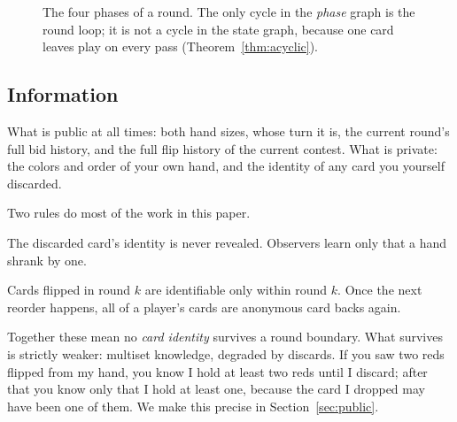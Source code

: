 \documentclass[11pt]{article}
\theoremstyle{plain}
\theoremstyle{definition}
\theoremstyle{remark}
\begin{document}
\begin{figure}[t]
\centering
{}
\caption{The four phases of a round. The only cycle in the \emph{phase}
graph is the round loop; it is not a cycle in the state graph, because one
card leaves play on every pass (Theorem~\ref{thm:acyclic}).}
\label{fig:phases}
\end{figure}

\subsection{Information}\label{sec:info}

What is public at all times: both hand sizes, whose turn it is, the current
round's full bid history, and the full flip history of the current contest.
What is private: the colors and order of your own hand, and the identity
of any card you yourself discarded.

Two rules do most of the work in this paper.

\begin{description}\itemsep3pt
  \item[Discard anonymity.] The discarded card's identity is never
        revealed. Observers learn only that a hand shrank by one.
  \item[Reorder scrambling.] Cards flipped in round $k$ are identifiable
        only within round $k$. Once the next reorder happens, all of a
        player's cards are anonymous card backs again.
\end{description}

Together these mean no \emph{card identity} survives a round boundary. What
survives is strictly weaker: multiset knowledge, degraded by discards. If
you saw two reds flipped from my hand, you know I hold at least two reds
until I discard; after that you know only that I hold at least one, because
the card I dropped may have been one of them. We make this precise in
Section~\ref{sec:public}.
\end{document}
